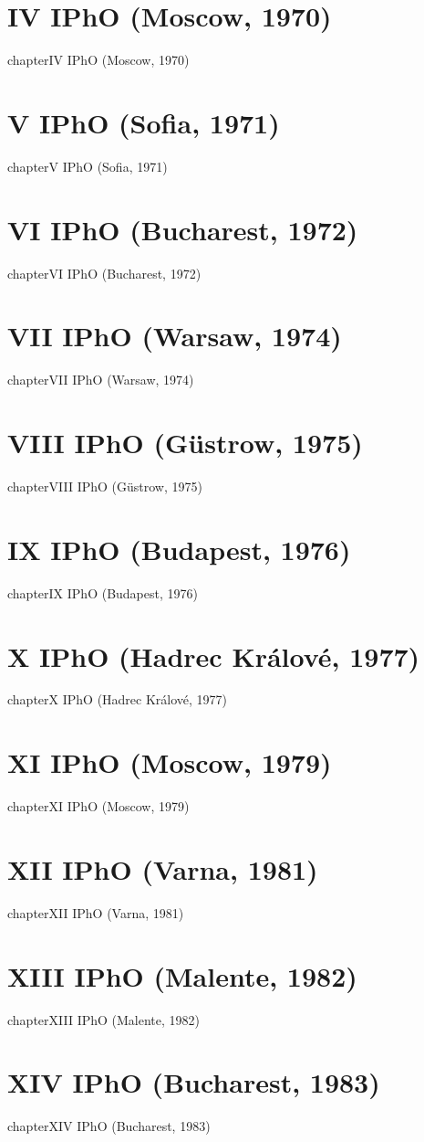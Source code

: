 \documentclass[12pt,a4paper]{book}
\begin{document}
\chapter*{IV IPhO (Moscow, 1970)}
{chapter}{IV IPhO (Moscow, 1970)}
\chapter*{V IPhO (Sofia, 1971)}
{chapter}{V IPhO (Sofia, 1971)}
\chapter*{VI IPhO (Bucharest, 1972)}
{chapter}{VI IPhO (Bucharest, 1972)}
\chapter*{VII IPhO (Warsaw, 1974)}
{chapter}{VII IPhO (Warsaw, 1974)}
\chapter*{VIII IPhO (G\"ustrow, 1975)}
{chapter}{VIII IPhO (G\"ustrow, 1975)}
\chapter*{IX IPhO (Budapest, 1976)}
{chapter}{IX IPhO (Budapest, 1976)}
\chapter*{X IPhO (Hadrec Kr\'alov\'e, 1977)}
{chapter}{X IPhO (Hadrec Kr\'alov\'e, 1977)}
\chapter*{XI IPhO (Moscow, 1979)}
{chapter}{XI IPhO (Moscow, 1979)}
\chapter*{XII IPhO (Varna, 1981)}
{chapter}{XII IPhO (Varna, 1981)}
\chapter*{XIII IPhO (Malente, 1982)}
{chapter}{XIII IPhO (Malente, 1982)}
\chapter*{XIV IPhO (Bucharest, 1983)}
{chapter}{XIV IPhO (Bucharest, 1983)}
\end{document}
